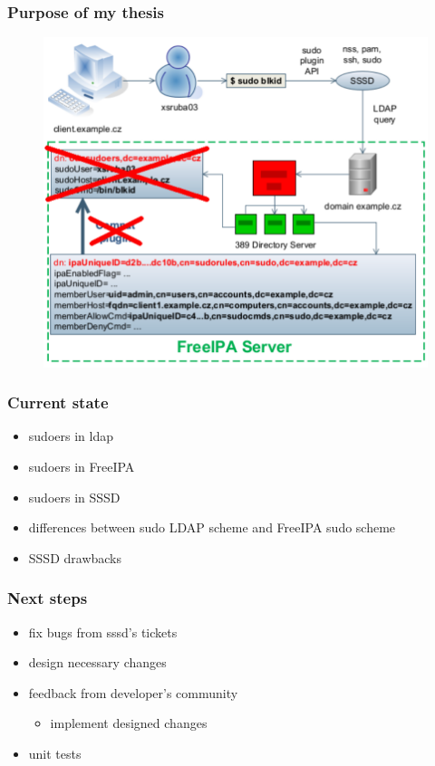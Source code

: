 \documentclass[pdftex,unicode,xcolor=table]{beamer}
\begin{document}
\begin{frame}
    \frametitle{Purpose of my thesis}
    \begin{figure}
        \includegraphics[scale=0.58]{img/2.pdf}
    \end{figure}
\end{frame}



\begin{frame}
    \frametitle{Current state}
    \begin{itemize}
        \item sudoers in ldap
        \item sudoers in FreeIPA
        \item sudoers in SSSD
        \item differences between sudo LDAP scheme and FreeIPA sudo scheme
        \item SSSD drawbacks
    \end{itemize}
\end{frame}

\begin{frame}
    \frametitle{Next steps}
    \begin{itemize}
        \item fix bugs from sssd's tickets
        \item design necessary changes
        \item feedback from developer's community
            \begin{itemize}
                \item implement designed changes
            \end{itemize}
        \item unit tests
    \end{itemize}
\end{frame}
\end{document}
